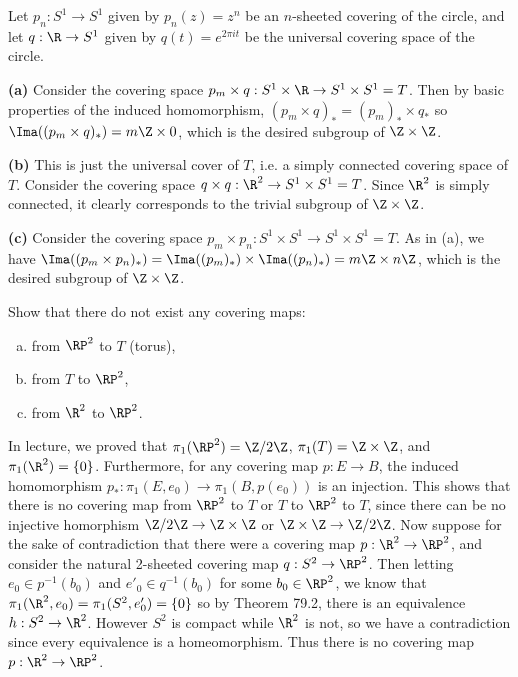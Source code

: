 \documentclass[11pt,letterpaper]{article}
\begin{document}
\begin{solution}
    Let $p_n : S^1 \to S^1$ given by $p_n(z) = z^n$ be an $n$-sheeted covering of the circle, and let $q : \R \to S^1$ given by $q(t)=e^{2\pi i t}$ be the universal covering space of the circle. 

    \textbf{(a)} Consider the covering space $p_m\times q : S^1\times \R \to S^1\times S^1=T$. Then by basic properties of the induced homomorphism, $(p_m\times q)_* = (p_m)_* \times q_*$ so $\Ima((p_m\times q)_*)=m\Z\times 0$, which is the desired subgroup of $\Z\times \Z$. 

    \textbf{(b)} This is just the universal cover of $T$, i.e. a simply connected covering space of $T$. Consider the covering space $q\times q : \R^2 \to S^1\times S^1=T$. Since $\R^2$ is simply connected, it clearly corresponds to the trivial subgroup of $\Z\times \Z$.

    \textbf{(c)} Consider the covering space $p_m\times p_n : S^1\times S^1 \to S^1\times S^1=T$. As in (a), we have $\Ima((p_m\times p_n)_*)=\Ima((p_m)_*)\times \Ima((p_n)_*)=m\Z\times n\Z$, which is the desired subgroup of $\Z\times \Z$.
\end{solution}

\begin{problem}
    Show that there do not exist any covering maps:
    \begin{enumerate}[(a)]
        \item from $\RP^2$ to $T$ (torus),
        \item from $T$ to $\RP^2$,
        \item from $\R^2$ to $\RP^2$.
    \end{enumerate}
\end{problem}

\begin{solution}
    In lecture, we proved that $\pi_1(\RP^2)=\Z/2\Z$, $\pi_1(T)=\Z\times \Z$, and $\pi_1(\R^2)=\{0\}$. Furthermore, for any covering map $p : E \to B$, the induced homomorphism $p_* : \pi_1(E,e_0) \to \pi_1(B, p(e_0))$ is an injection. This shows that there is no covering map from $\RP^2$ to $T$ or $T$ to $\RP^2$ to $T$, since there can be no injective homorphism $\Z /2\Z\to \Z\times \Z$ or $\Z\times \Z \to \Z/2\Z$. Now suppose for the sake of contradiction that there were a covering map $p : \R^2 \to \RP^2$, and consider the natural 2-sheeted covering map $q : S^2 \to \RP^2$. Then letting $e_0\in p^{-1}(b_0)$ and $e'_0\in q^{-1}(b_0)$ for some $b_0\in \RP^2$, we know that $\pi_1(\R^2,e_0)=\pi_1(S^2, e'_0)=\{0\}$ so by Theorem 79.2, there is an equivalence $h : S^2\to \R^2$. However $S^2$ is compact while $\R^2$ is not, so we have a contradiction since every equivalence is a homeomorphism. Thus there is no covering map $p : \R^2\to\RP^2$. 
\end{solution}
\end{document}
